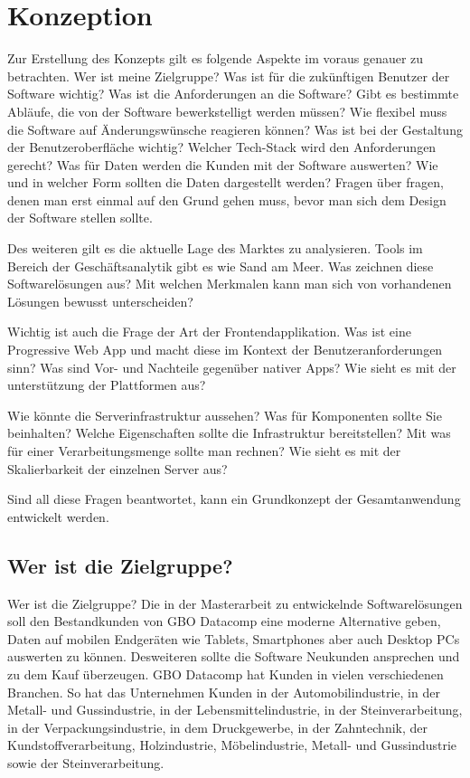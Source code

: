 \chapter{Konzeption}

Zur Erstellung des Konzepts gilt es folgende Aspekte im voraus genauer zu betrachten.
Wer ist meine Zielgruppe? Was ist für die zukünftigen Benutzer der Software wichtig?
Was ist die Anforderungen an die Software? Gibt es bestimmte Abläufe, die von der
Software bewerkstelligt werden müssen? Wie flexibel muss die Software auf Änderungswünsche
reagieren können? Was ist bei der Gestaltung der Benutzeroberfläche wichtig? 
Welcher Tech-Stack wird den Anforderungen gerecht? Was für Daten werden die Kunden mit der
Software auswerten? Wie und in welcher Form sollten die Daten dargestellt werden? 
Fragen über fragen, denen man erst einmal auf den Grund gehen muss, bevor man sich dem
Design der Software stellen sollte.

Des weiteren gilt es die aktuelle Lage des Marktes zu analysieren. Tools im Bereich der
Geschäftsanalytik gibt es wie Sand am Meer.\cite{WikiBISoftware} Was zeichnen diese Softwarelösungen aus? Mit welchen
Merkmalen kann man sich von vorhandenen Lösungen bewusst unterscheiden? 

Wichtig ist auch die Frage der Art der Frontendapplikation. Was ist eine Progressive Web App und
macht diese im Kontext der Benutzeranforderungen sinn? Was sind Vor- und Nachteile gegenüber
nativer Apps? Wie sieht es mit der unterstützung der Plattformen aus?

Wie könnte die Serverinfrastruktur aussehen? Was für Komponenten sollte Sie beinhalten? Welche Eigenschaften
sollte die Infrastruktur bereitstellen? Mit was für einer Verarbeitungsmenge sollte man rechnen? Wie sieht
es mit der Skalierbarkeit der einzelnen Server aus?

Sind all diese Fragen beantwortet, kann ein Grundkonzept der Gesamtanwendung entwickelt werden.

\section{Wer ist die Zielgruppe?}
Wer ist die Zielgruppe? Die in der Masterarbeit zu entwickelnde Softwarelösungen
soll den Bestandkunden von GBO Datacomp eine moderne Alternative geben, Daten 
auf mobilen Endgeräten wie Tablets, Smartphones aber auch Desktop PCs auswerten zu können.
Desweiteren sollte die Software Neukunden ansprechen und zu dem Kauf überzeugen. GBO Datacomp
hat Kunden in vielen verschiedenen Branchen. So hat das Unternehmen Kunden in der
Automobilindustrie, in der Metall- und Gussindustrie, in der Lebensmittelindustrie,
in der Steinverarbeitung, in der Verpackungsindustrie, in dem Druckgewerbe, in der
Zahntechnik, der Kundstoffverarbeitung, Holzindustrie, Möbelindustrie, Metall- und Gussindustrie sowie
der Steinverarbeitung.\cite{GBODatacompBranchenloesungen}

